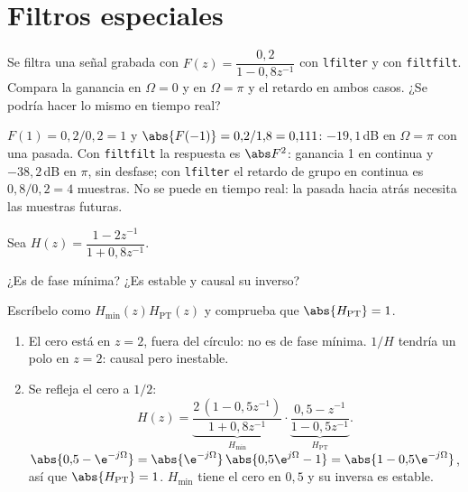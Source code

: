 \documentclass[11pt,a4paper]{scrartcl}
\begin{document}
\section*{Filtros especiales}

\begin{ejercicio}
  Se filtra una señal grabada con $F(z)=\dfrac{0{,}2}{1-0{,}8z^{-1}}$ con \texttt{lfilter} y con \texttt{filtfilt}. Compara la ganancia en $\Omega=0$ y en $\Omega=\pi$ y el retardo en ambos casos. ¿Se podría hacer lo mismo en tiempo real?
\end{ejercicio}
\begin{solucion}
  $F(1)=0{,}2/0{,}2=1$ y $\abs{F(-1)}=0{,}2/1{,}8=0{,}111$: $-19{,}1$\,dB en $\Omega=\pi$ con una pasada. Con \texttt{filtfilt} la respuesta es $\abs F^2$: ganancia 1 en continua y $-38{,}2$\,dB en $\pi$, sin desfase; con \texttt{lfilter} el retardo de grupo en continua es $0{,}8/0{,}2=4$ muestras. No se puede en tiempo real: la pasada hacia atrás necesita las muestras futuras.
\end{solucion}

\begin{ejercicio}
  Sea $H(z)=\dfrac{1-2z^{-1}}{1+0{,}8z^{-1}}$.
  \begin{incisos}[1]
    \item ¿Es de fase mínima? ¿Es estable y causal su inverso?
    \item Escríbelo como $H_{\min}(z)H_{\text{PT}}(z)$ y comprueba que $\abs{H_{\text{PT}}}=1$.
  \end{incisos}
\end{ejercicio}
\begin{solucion}
  \begin{enumerate}[label=\alph*)]
    \item El cero está en $z=2$, fuera del círculo: no es de fase mínima. $1/H$ tendría un polo en $z=2$: causal pero inestable.
    \item Se refleja el cero a $1/2$:
    \[
      H(z)=\underbrace{\frac{2\,(1-0{,}5z^{-1})}{1+0{,}8z^{-1}}}_{H_{\min}}\cdot\underbrace{\frac{0{,}5-z^{-1}}{1-0{,}5z^{-1}}}_{H_{\text{PT}}}.
    \]
    $\abs{0{,}5-\e^{-j\Omega}}=\abs{\e^{-j\Omega}}\,\abs{0{,}5\e^{j\Omega}-1}=\abs{1-0{,}5\e^{-j\Omega}}$, así que $\abs{H_{\text{PT}}}=1$. $H_{\min}$ tiene el cero en $0{,}5$ y su inversa es estable.
  \end{enumerate}
\end{solucion}
\end{document}
